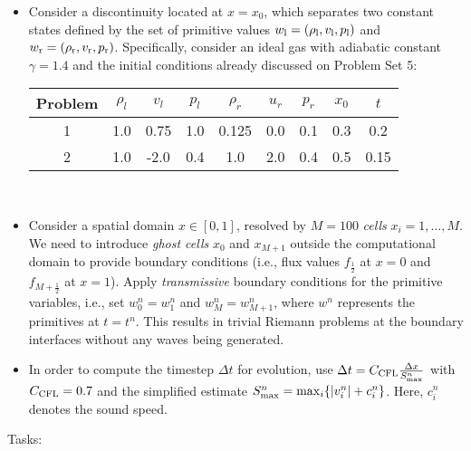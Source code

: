 \documentclass[letter,11pt]{article}
\begin{document}
\begin{itemize}
  \item Consider a discontinuity located at $x=x_0$, which separates two constant states defined by the set of primitive values $w_{\rm l} = (\rho_{\rm l}, v_{\rm l}, p_{\rm l})$ and $w_{\rm r} = (\rho_{\rm r}, v_{\rm r}, p_{\rm r})$. Specifically, consider an ideal gas with adiabatic constant $\gamma=1.4$ and the initial conditions already discussed on Problem Set 5:

    \begin{tabular}{c|c|c|c|c|c|c|c|c}
    Problem & $\rho_l$ & $v_l$ & $p_l$ & $\rho_r$ & $u_r$ & $p_r$ & $x_0$ & $t$ \\
    \hline
    1 & 1.0 & 0.75 & 1.0 & 0.125 & 0.0 & 0.1 & 0.3 & 0.2 \\
    2 & 1.0 & -2.0 & 0.4 & 1.0 & 2.0 & 0.4 & 0.5 & 0.15\\

\end{tabular}\\
  \item Consider a spatial domain $x\in[0,1]$, resolved by $M=100$ \emph{cells} $x_i=1,\ldots,M$. We need to introduce \emph{ghost cells} $x_0$ and $x_{M+1}$ outside the computational domain to provide boundary conditions (i.e., flux values $f_{\frac{1}{2}}$ at $x=0$ and $f_{M+\frac{1}{2}}$ at $x=1$). Apply \emph{transmissive} boundary conditions for the primitive variables, i.e., set $w^n_{0}=w^n_1$ and $w^n_{M}=w^n_{M+1}$, where $w^n$ represents the primitives at $t=t^n$. This results in trivial Riemann problems at the boundary interfaces without any waves being generated.

  \item In order to compute the timestep $\Delta t$ for evolution, use $\Delta t = C_{\rm CFL} \frac{\Delta x}{S^n_{\rm max}}$ with $C_{\rm CFL}=0.7$ and the simplified estimate $S^n_{\rm max}=\mathrm{max}_i\{|v_i^n| + c_i^n\}$. Here, $c_i^n$ denotes the sound speed.
\end{itemize}

\noindent Tasks:
\end{document}
